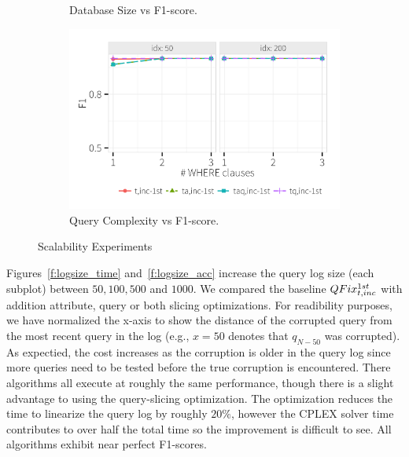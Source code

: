 \begin{figure}[h]
\begin{subfigure}[t]{.3\textwidth}
      \vspace*{-.1in}
      \caption{Database Size vs F1-score. }
      \label{f:dbsize_acc} 
    \end{subfigure}
    \begin{subfigure}[t]{.3\textwidth}
      \includegraphics[width = .95\columnwidth]{figures/where_acc}
      \vspace*{-.1in}
      \caption{Query Complexity vs F1-score.}
      \label{f:where_acc} 
    \end{subfigure}
    \caption{Scalability Experiments}
  \end{figure}



Figures~\ref{f:logsize_time} and~\ref{f:logsize_acc} increase the query log size (each subplot) between $50, 100, 500$ and $1000$.
We compared the baseline $QFix_{t,inc}^{1st}$ with addition attribute, query or both slicing optimizations.
For readibility purposes, we have normalized the x-axis to show the distance of the corrupted query from the most recent query in the log
(e.g., $x=50$ denotes that $q_{N-50}$ was corrupted).
As expectied, the cost increases as the corruption is older in the query log since more queries need to be tested before the
true corruption is encountered.  There algorithms all execute at roughly the same performance, though there is a slight advantage to
using the query-slicing optimization. The optimization reduces the time to linearize the query log by roughly $20\%$, however
the CPLEX solver time contributes to over half the total time so the improvement is difficult to see.
All algorithms exhibit near perfect F1-scores.



